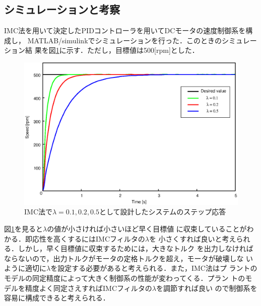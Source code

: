 \documentclass[a4paper,12pt]{jarticle}
\begin{document}
\subsection{シミュレーションと考察}
IMC法を用いて決定したPIDコントローラを用いてDCモータの速度制御系を構成し，
MATLAB/simulinkでシミュレーションを行った．このときのシミュレーション結
果を図\ref{fig:IMC_result}に示す．ただし，目標値は500[rpm]とした．
%
\begin{figure}[tbp]
 \begin{center}
  \includegraphics[width = 150mm]{fig/IMC_result.eps}
 \end{center}
 \caption{IMC法で$\lambda=0.1,0.2,0.5$として設計したシステムのステップ応答}
 \label{fig:IMC_result}
\end{figure}
%
図\ref{fig:IMC_result}を見ると$\lambda$の値が小さければ小さいほど早く目標値
に収束していることがわかる．即応性を高くするにはIMCフィルタの$\lambda$を
小さくすれば良いと考えられる．しかし，早く目標値に収束するためには，大きなトルク
を出力しなければならないので，出力トルクがモータの定格トルクを超え，モータが破壊しな
いように適切に$\lambda$を設定する必要があると考えられる．また，IMC法はプ
ラントのモデルの同定精度によって大きく制御系の性能が変わってくる．プラン
トのモデルを精度よく同定さえすればIMCフィルタの$\lambda$を調節すれば良い
ので制御系を容易に構成できると考えられる．
%
\end{document}
